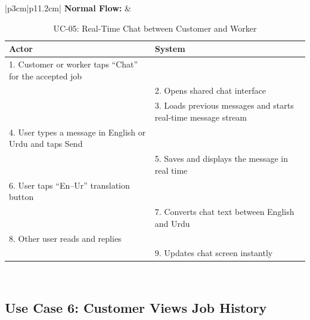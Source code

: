 {\small
\renewcommand{\arraystretch}{1.05}
\begin{table}[H]
\centering
\begin{tabular}{|p{3cm}|p{11.2cm}|}
\hline
\textbf{Normal Flow:} &
\begin{tabular}[t]{|p{5.4cm}|p{5.4cm}|}
\hline
\textbf{Actor} & \textbf{System} \\ \hline
1. Customer or worker taps ``Chat'' for the accepted job & \\ \hline
 & 2. Opens shared chat interface \\ \hline
 & 3. Loads previous messages and starts real-time message stream \\ \hline
4. User types a message in English or Urdu and taps Send & \\ \hline
 & 5. Saves and displays the message in real time \\ \hline
6. User taps ``En--Ur'' translation button & \\ \hline
 & 7. Converts chat text between English and Urdu \\ \hline
8. Other user reads and replies & \\ \hline
 & 9. Updates chat screen instantly \\ \hline
\end{tabular} \\ \hline
\end{tabular}
\caption{UC-05: Real-Time Chat between Customer and Worker}
\end{table}
}

\newpage

\subsection*{Use Case 6: Customer Views Job History}

